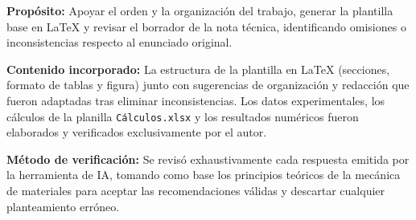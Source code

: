 \documentclass[10pt,letterpaper]{article}
\begin{document}
\textbf{Propósito:} Apoyar el orden y la organización del trabajo, generar la plantilla base en \LaTeX{} y revisar el borrador de la nota técnica, identificando omisiones o inconsistencias respecto al enunciado original.

\textbf{Contenido incorporado:} La estructura de la plantilla en \LaTeX{} (secciones, formato de tablas y figura) junto con sugerencias de organización y redacción que fueron adaptadas tras eliminar inconsistencias. Los datos experimentales, los cálculos de la planilla \texttt{Cálculos.xlsx} y los resultados numéricos fueron elaborados y verificados exclusivamente por el autor.

\textbf{Método de verificación:} Se revisó exhaustivamente cada respuesta emitida por la herramienta de IA, tomando como base los principios teóricos de la mecánica de materiales para aceptar las recomendaciones válidas y descartar cualquier planteamiento erróneo.





\end{document}
